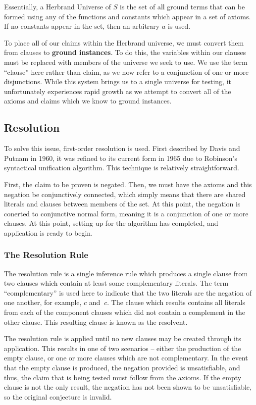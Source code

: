 Essentially, a Herbrand Universe of $S$ is the set of all ground terms that can be formed using any of the functions and constants which appear in a set of axioms. If no constants appear in the set, then an arbitrary $a$ is used.

To place all of our claims within the Herbrand universe, we must convert them from clauses to \textbf{ground instances}. To do this, the variables within our clauses must be replaced with members of the universe we seek to use. We use the term ``clause'' here rather than claim, as we now refer to a conjunction of one or more disjunctions. While this system brings us to a single universe for testing, it unfortunately experiences rapid growth as we attempt to convert all of the axioms and claims which we know to ground instances.

\subsection{Resolution} 

To solve this issue, first-order resolution is used. First described by Davis and Putnam in 1960, it was refined to its current form in 1965 due to Robinson's syntactical unification algorithm. This technique is relatively straightforward.

First, the claim to be proven is negated. Then, we must have the axioms and this negation be conjunctively connected, which simply means that there are shared literals and clauses between members of the set. At this point, the negation is conerted to conjunctive normal form, meaning it is a conjunction of one or more clauses. At this point, setting up for the algorithm has completed, and application is ready to begin.

\subsubsection{The Resolution Rule}

The resolution rule is a single inference rule which produces a single clause from two clauses which contain at least some complementary literals. The term ``complementary'' is used here to indicate that the two literals are the negation of one another, for example, $c$ and $~c$. The clause which results contains all literals from each of the component clauses which did not contain a complement in the other clause. This resulting clause is known as the resolvent. 

The resolution rule is applied until no new clauses may be created through its application. This results in one of two scenarios -- either the production of the empty clause, or one or more clauses which are not complementary. In the event that the empty clause is produced, the negation provided is unsatisfiable, and thus, the claim that is being tested must follow from the axioms. If the empty clause is not the only result, the negation has not been shown to be unsatisfiable, so the original conjecture is invalid.

